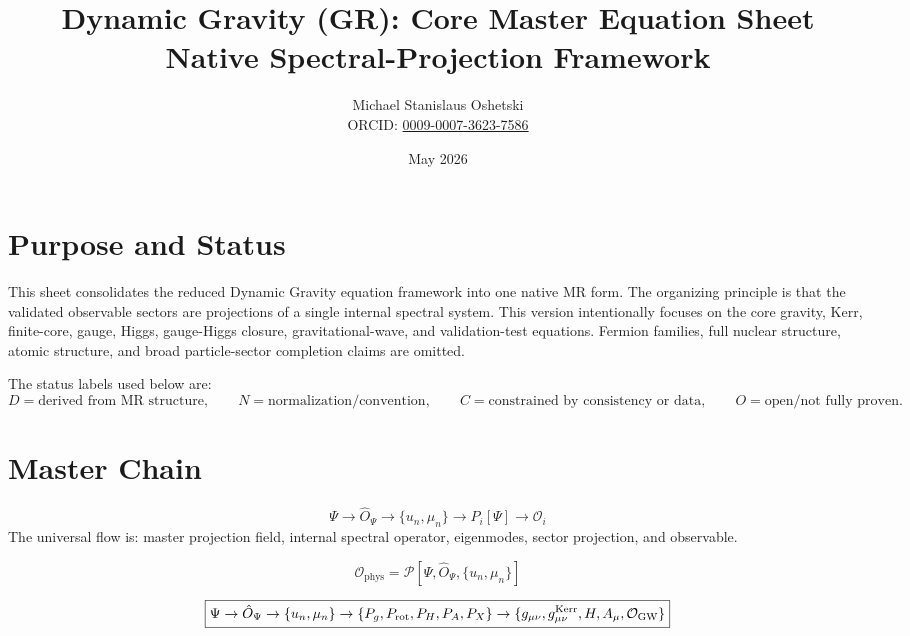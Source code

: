 \documentclass[11pt]{article}
\title{Dynamic Gravity (GR): Core Master Equation Sheet\\Native Spectral-Projection Framework}
\author{Michael Stanislaus Oshetski \\ \small ORCID: \href{https://orcid.org}{0009-0007-3623-7586}}
\date{May 2026}
\newcommand{\phys}{\mathrm{phys}}
\newcommand{\Kerr}{\mathrm{Kerr}}
\begin{document}
\maketitle

\section*{Purpose and Status}
This sheet consolidates the reduced Dynamic Gravity equation framework into one native MR form.  The organizing principle is that the validated observable sectors are projections of a single internal spectral system.  This version intentionally focuses on the core gravity, Kerr, finite-core, gauge, Higgs, gauge-Higgs closure, gravitational-wave, and validation-test equations.  Fermion families, full nuclear structure, atomic structure, and broad particle-sector completion claims are omitted.

The status labels used below are:
\[
D=\text{derived from MR structure},\qquad
N=\text{normalization/convention},\qquad
C=\text{constrained by consistency or data},\qquad
O=\text{open/not fully proven}.
\]

\section{Master Chain}
\begin{equation}
\boxed{
\Psi \rightarrow \hat O_\Psi \rightarrow \{u_n,\mu_n\}
\rightarrow P_i[\Psi] \rightarrow \mathcal O_i
}
\end{equation}
The universal flow is: master projection field, internal spectral operator, eigenmodes, sector projection, and observable.

\begin{equation}
\boxed{
\mathcal O_{\phys}
=
\mathcal P\left[\Psi,\hat O_\Psi,\{u_n,\mu_n\}\right]
}
\end{equation}

\begin{equation}
\boxed{
\Psi
\rightarrow
\hat O_\Psi
\rightarrow
\{u_n,\mu_n\}
\rightarrow
\{P_g,P_{\rm rot},P_H,P_A,P_X\}
\rightarrow
\{g_{\mu\nu},g_{\mu\nu}^{\Kerr},H,A_\mu,\mathcal O_{\rm GW}\}
}
\end{equation}
\end{document}
